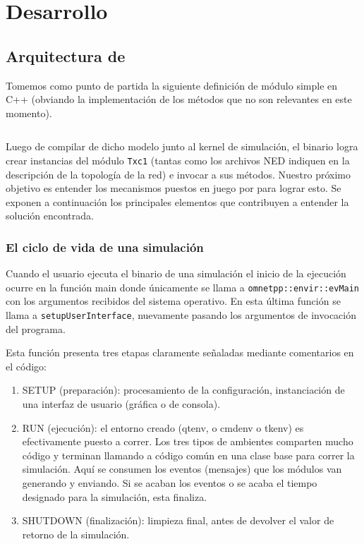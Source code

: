 \chapter{Desarrollo}\label{sec:des}
\section{Arquitectura de \omnetpp{}}

Tomemos como punto de partida la siguiente definición de módulo simple en C++
(obviando la implementación de los métodos que no son relevantes en este
momento).

\inputminted{c++}{codelistings/txc1.cc}

Luego de compilar de dicho modelo junto al kernel de simulación, el binario
logra crear instancias del módulo \verb!Txc1! (tantas como los archivos NED
indiquen en la descripción de la topología de la red) e invocar a sus métodos.
Nuestro próximo objetivo es entender los mecanismos puestos en juego por
\omnetpp{} para lograr esto. Se exponen a continuación los principales elementos
que contribuyen a entender la solución encontrada.

\subsection{El ciclo de vida de una simulación}

Cuando el usuario ejecuta el binario de una simulación el inicio de la
ejecución ocurre en la función main donde únicamente se llama a
\verb!omnetpp::envir::evMain! con los argumentos recibidos del sistema
operativo. En esta última función se llama a \linebreak
\verb!setupUserInterface!, nuevamente pasando los argumentos de invocación del
programa.

Esta función presenta tres etapas claramente señaladas mediante comentarios en
el código:

\begin{enumerate}
    \item SETUP (preparación): procesamiento de la configuración, instanciación
de una interfaz de usuario (gráfica o de consola).

    \item RUN (ejecución): el entorno creado (qtenv, o cmdenv o tkenv) es
efectivamente puesto a correr. Los tres tipos de ambientes comparten mucho
código y terminan llamando a código común en una clase base para correr la
simulación. Aquí se consumen los eventos (mensajes) que los módulos van
generando y enviando. Si se acaban los eventos o se acaba el tiempo designado
para la simulación, esta finaliza.

    \item SHUTDOWN (finalización): limpieza final, antes de devolver el valor
de retorno de la simulación.
\end{enumerate}

